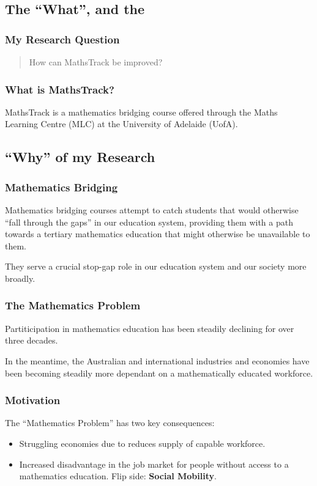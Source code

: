 \documentclass[14pt]{beamer}
\begin{document}
\subsection{The ``What'', and the}

\begin{frame}
\frametitle{My Research Question}
\begin{quote}
	How can MathsTrack be improved?
\end{quote}
\end{frame}

\begin{frame}
\frametitle{What is MathsTrack?}
MathsTrack is a mathematics bridging course offered through the Maths Learning Centre (MLC) at the University of Adelaide (UofA).
\end{frame}

\subsection{``Why'' of my Research}

\begin{frame}
\frametitle{Mathematics Bridging}
Mathematics bridging courses attempt to catch students that would otherwise ``fall through the gaps'' in our education system, providing them with a path towards a tertiary mathematics education that might otherwise be unavailable to them.

They serve a crucial stop-gap role in our education system and our society more broadly.
\end{frame}

\begin{frame}
\frametitle{The Mathematics Problem}
Partiticipation in mathematics education has been steadily declining for over three decades.

In the meantime, the Australian and international industries and economies have been becoming steadily more dependant on a mathematically educated workforce.
\end{frame}

\begin{frame}
\frametitle{Motivation}
The ``Mathematics Problem'' has two key consequences:
\begin{itemize}
	\item Struggling economies due to reduces supply of capable workforce.
	\item Increased disadvantage in the job market for people without access to a mathematics education. Flip side: \textbf{Social Mobility}.
\end{itemize}
\end{frame}
\end{document}
